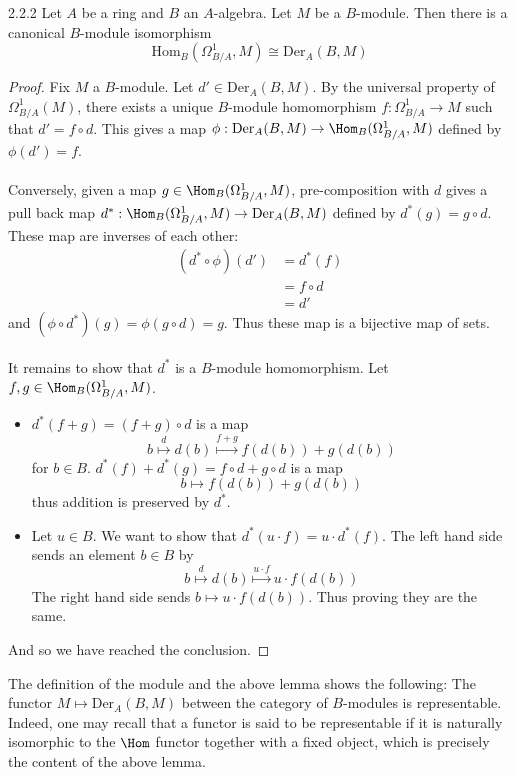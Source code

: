 \documentclass[a4paper]{article}
\begin{document}
\begin{lmm}{}{2.2.2} Let $A$ be a ring and $B$ an $A$-algebra. Let $M$ be a $B$-module. Then there is a canonical $B$-module isomorphism $$\text{Hom}_B(\Omega_{B/A}^1,M)\cong\text{Der}_A(B,M)$$ 
\begin{proof}
Fix $M$ a $B$-module. Let $d'\in\text{Der}_A(B,M)$. By the universal property of $\Omega_{B/A}^1(M)$, there exists a unique $B$-module homomorphism $f:\Omega_{B/A}^1\to M$ such that $d'=f\circ d$. This gives a map $\phi:\text{Der}_A(B,M)\to\Hom_B(\Omega_{B/A}^1,M)$ defined by $\phi(d')=f$. \\~\\
Conversely, given a map $g\in\Hom_B(\Omega_{B/A}^1,M)$, pre-composition with $d$ gives a pull back map $d^\ast:\Hom_B(\Omega_{B/A}^1,M)\to\text{Der}_A(B,M)$ defined by $d^\ast(g)=g\circ d$. These map are inverses of each other: 
\begin{align*}
(d^\ast\circ\phi)(d')&=d^\ast(f)\\
&=f\circ d\\
&=d'\tag{By universal property}
\end{align*} and 
$(\phi\circ d^\ast)(g)=\phi(g\circ d)=g$. 
Thus these map is a bijective map of sets. \\~\\

It remains to show that $d^\ast$ is a $B$-module homomorphism. Let $f,g\in\Hom_B(\Omega_{B/A}^1,M)$. 
\begin{itemize}
\item $d^\ast(f+g)=(f+g)\circ d$ is a map $$b\overset{d}{\mapsto}d(b)\overset{f+g}{\mapsto}f(d(b))+g(d(b))$$ for $b\in B$. $d^\ast(f)+d^\ast(g)=f\circ d+g\circ d$ is a map $$b\mapsto f(d(b))+g(d(b))$$ thus addition is preserved by $d^\ast$. 
\item Let $u\in B$. We want to show that $d^\ast(u\cdot f)=u\cdot d^\ast(f)$. The left hand side sends an element $b\in B$ by $$b\overset{d}{\mapsto}d(b)\overset{u\cdot f}{\mapsto}u\cdot f(d(b))$$ The right hand side sends $b\mapsto u\cdot f(d(b))$. Thus proving they are the same. 
\end{itemize}
And so we have reached the conclusion. 
\end{proof}
\end{lmm}

The definition of the module and the above lemma shows the following: The functor $M\mapsto\text{Der}_A(B,M)$ between the category of $B$-modules is representable. Indeed, one may recall that a functor is said to be representable if it is naturally isomorphic to the $\Hom$ functor together with a fixed object, which is precisely the content of the above lemma. \\~\\
\end{document}
